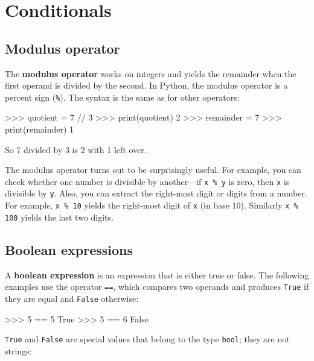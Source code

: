 \chapter{Conditionals}

\section{Modulus operator}


The {\bf modulus operator} works on integers and yields the remainder
when the first operand is divided by the second.  In Python, the
modulus operator is a percent sign (\verb"%").  The syntax is the same
as for other operators:

\beforeverb
\begin{pyinterpreter}
>>> quotient = 7 // 3
>>> print(quotient)
2
>>> remainder = 7 %
>>> print(remainder)
1
\end{pyinterpreter}
\afterverb
%
So 7 divided by 3 is 2 with 1 left over.

The modulus operator turns out to be surprisingly useful.  For
example, you can check whether one number is divisible by another---if
{\tt x \% y} is zero, then {\tt x} is divisible by {\tt y}.
%
%
Also, you can extract the right-most digit
or digits from a number.  For example, {\tt x \% 10} yields the
right-most digit of {\tt x} (in base 10).  Similarly {\tt x \% 100}
yields the last two digits.


\section{Boolean expressions}

A {\bf boolean expression} is an expression that is either true
or false.  The following examples use the 
operator {\tt ==}, which compares two operands and produces
{\tt True} if they are equal and {\tt False} otherwise:

\beforeverb
\begin{pyinterpreter}
>>> 5 == 5
True
>>> 5 == 6
False
\end{pyinterpreter}
\afterverb
%
{\tt True} and {\tt False} are special
values that belong to the type {\tt bool}; they are not strings:


